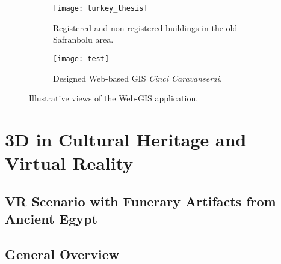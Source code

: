 

\begin{figure}
  \centering
  \begin{subfigure}[b]{0.45\textwidth}
      \centering
      \texttt{[image: turkey\_thesis]}
      \caption{Registered and non-registered buildings in the old Safranbolu area.}
      \label{fig:x}
  \end{subfigure}
  \hfill
  \begin{subfigure}[b]{0.45\textwidth}
      \centering
      \texttt{[image: test]}
      \caption{Designed Web-based \gls{GIS} \textit{Cinci Caravanserai}.}
      \label{fig:y}
  \end{subfigure}
     \caption{Illustrative views of the Web-\gls{GIS} application.}
     \label{fig:z}
\end{figure}





\section{\gls{3D} in Cultural Heritage and Virtual Reality}
\label{sec:3d_vr}

\subsection{\gls{VR} Scenario with Funerary Artifacts from Ancient Egypt} 
\label{sec:3d_vr_devices}

\subsection*{General Overview}

